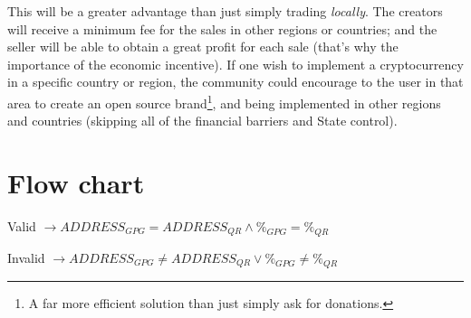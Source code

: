 \documentclass[12pt,a4paper]{article}
\begin{document}
This will be a greater advantage than just simply trading \textit{locally}. The creators will receive a minimum fee for the sales in other regions or countries; and the seller will be able to obtain a great profit for each sale (that's why the importance of the economic incentive). If one wish to implement a cryptocurrency in a specific country or region, the community could encourage to the user in that area to create an open source brand\footnote{A far more efficient solution than just simply ask for donations.}, and being implemented in other regions and countries (skipping all of the financial barriers and State control).

\newpage

\section{Flow chart}

\begin{center}

\end{center}

Valid $ \rightarrow ADDRESS_{GPG} = ADDRESS_{QR} \wedge \%_{GPG} = \%_{QR} $

Invalid $ \rightarrow ADDRESS_{GPG} \neq ADDRESS_{QR} \vee \%_{GPG} \neq \%_{QR} $




\end{document}
